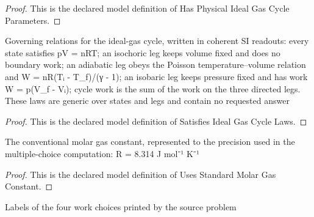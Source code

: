 \begin{proof}
  This is the declared model definition of Has Physical Ideal Gas Cycle Parameters.
\end{proof}
\begin{definition}
  \label{def:physics:phyx-mini-0348:phyxminiproblems-problemphyxmini0348-satisfiesidealgascyclelaws}
  Governing relations for the ideal-gas cycle, written in coherent SI readouts: every state satisfies pV = nRT; an isochoric leg keeps volume fixed and does no boundary work; an adiabatic leg obeys the Poisson temperature--volume relation and W = nR(Tᵢ - T\_f)/(γ - 1); an isobaric leg keeps pressure fixed and has work W = p(V\_f - Vᵢ); cycle work is the sum of the work on the three directed legs. These laws are generic over states and legs and contain no requested answer
\end{definition}
\begin{proof}
  This is the declared model definition of Satisfies Ideal Gas Cycle Laws.
\end{proof}
\begin{definition}
  \label{def:physics:phyx-mini-0348:phyxminiproblems-problemphyxmini0348-usesstandardmolargasconstant}
  The conventional molar gas constant, represented to the precision used in the multiple-choice computation: R = 8.314 J mol⁻¹ K⁻¹
\end{definition}
\begin{proof}
  This is the declared model definition of Uses Standard Molar Gas Constant.
\end{proof}
\begin{definition}
  \label{def:physics:phyx-mini-0348:phyxminiproblems-problemphyxmini0348-answerchoice}
  Labels of the four work choices printed by the source problem
\end{definition}
